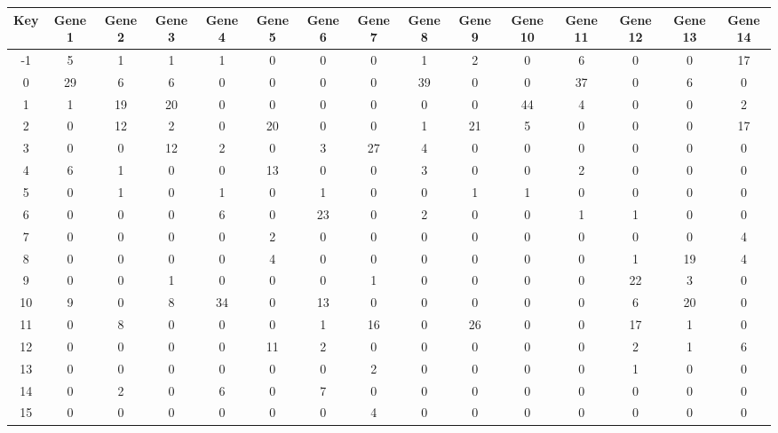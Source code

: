 \begin{tabular}{|c|c|c|c|c|c|c|c|c|c|c|c|c|c|c|}
\hline
Key & Gene 1 & Gene 2 & Gene 3 & Gene 4 & Gene 5 & Gene 6 & Gene 7 & Gene 8 & Gene 9 & Gene 10 & Gene 11 & Gene 12 & Gene 13 & Gene 14 \\
\hline
-1 & 5 & 1 & 1 & 1 & 0 & 0 & 0 & 1 & 2 & 0 & 6 & 0 & 0 & 17 \\
0 & 29 & 6 & 6 & 0 & 0 & 0 & 0 & 39 & 0 & 0 & 37 & 0 & 6 & 0 \\
1 & 1 & 19 & 20 & 0 & 0 & 0 & 0 & 0 & 0 & 44 & 4 & 0 & 0 & 2 \\
2 & 0 & 12 & 2 & 0 & 20 & 0 & 0 & 1 & 21 & 5 & 0 & 0 & 0 & 17 \\
3 & 0 & 0 & 12 & 2 & 0 & 3 & 27 & 4 & 0 & 0 & 0 & 0 & 0 & 0 \\
4 & 6 & 1 & 0 & 0 & 13 & 0 & 0 & 3 & 0 & 0 & 2 & 0 & 0 & 0 \\
5 & 0 & 1 & 0 & 1 & 0 & 1 & 0 & 0 & 1 & 1 & 0 & 0 & 0 & 0 \\
6 & 0 & 0 & 0 & 6 & 0 & 23 & 0 & 2 & 0 & 0 & 1 & 1 & 0 & 0 \\
7 & 0 & 0 & 0 & 0 & 2 & 0 & 0 & 0 & 0 & 0 & 0 & 0 & 0 & 4 \\
8 & 0 & 0 & 0 & 0 & 4 & 0 & 0 & 0 & 0 & 0 & 0 & 1 & 19 & 4 \\
9 & 0 & 0 & 1 & 0 & 0 & 0 & 1 & 0 & 0 & 0 & 0 & 22 & 3 & 0 \\
10 & 9 & 0 & 8 & 34 & 0 & 13 & 0 & 0 & 0 & 0 & 0 & 6 & 20 & 0 \\
11 & 0 & 8 & 0 & 0 & 0 & 1 & 16 & 0 & 26 & 0 & 0 & 17 & 1 & 0 \\
12 & 0 & 0 & 0 & 0 & 11 & 2 & 0 & 0 & 0 & 0 & 0 & 2 & 1 & 6 \\
13 & 0 & 0 & 0 & 0 & 0 & 0 & 2 & 0 & 0 & 0 & 0 & 1 & 0 & 0 \\
14 & 0 & 2 & 0 & 6 & 0 & 7 & 0 & 0 & 0 & 0 & 0 & 0 & 0 & 0 \\
15 & 0 & 0 & 0 & 0 & 0 & 0 & 4 & 0 & 0 & 0 & 0 & 0 & 0 & 0 \\
\hline
\end{tabular}